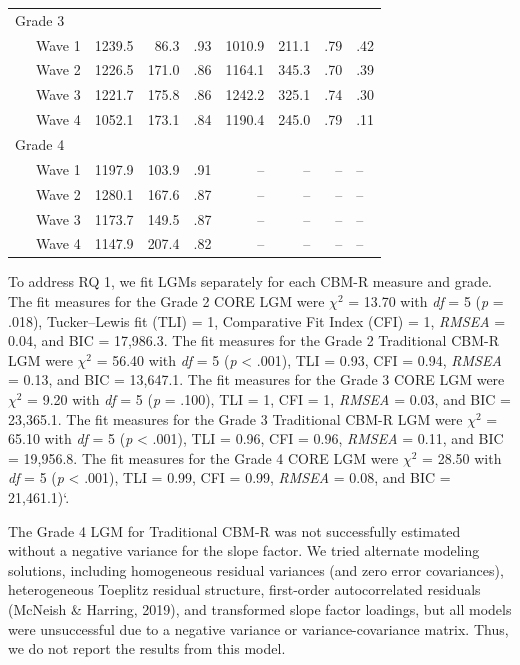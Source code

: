 \documentclass[
  english,
  man, fleqn, noextraspace]{apa6}
\begin{document}
\begin{center}
\begin{ThreePartTable}
\begin{longtable}{lrrrrrrl}
Grade 3 &  &  &  &  &  &  & \\
\ \ \ Wave 1 & 1239.5 & 86.3 & .93 & 1010.9 & 211.1 & .79 & .42\\
\ \ \ Wave 2 & 1226.5 & 171.0 & .86 & 1164.1 & 345.3 & .70 & .39\\
\ \ \ Wave 3 & 1221.7 & 175.8 & .86 & 1242.2 & 325.1 & .74 & .30\\
\ \ \ Wave 4 & 1052.1 & 173.1 & .84 & 1190.4 & 245.0 & .79 & .11\\
Grade 4 &  &  &  &  &  &  & \\
\ \ \ Wave 1 & 1197.9 & 103.9 & .91 & -- & -- & -- & --\\
\ \ \ Wave 2 & 1280.1 & 167.6 & .87 & -- & -- & -- & --\\
\ \ \ Wave 3 & 1173.7 & 149.5 & .87 & -- & -- & -- & --\\
\ \ \ Wave 4 & 1147.9 & 207.4 & .82 & -- & -- & -- & --\\
\bottomrule
\end{longtable}

\end{ThreePartTable}
\end{center}

To address RQ 1, we fit LGMs separately for each CBM-R measure and grade. The fit measures for the Grade 2 CORE LGM were \(\chi^2\) = 13.70 with \emph{df} = 5 (\emph{p} = .018), Tucker--Lewis fit (TLI) = 1, Comparative Fit Index (CFI) = 1, \emph{RMSEA} = 0.04, and BIC = 17,986.3. The fit measures for the Grade 2 Traditional CBM-R LGM were \(\chi^2\) = 56.40 with \emph{df} = 5 (\emph{p} \textless{} .001), TLI = 0.93, CFI = 0.94, \emph{RMSEA} = 0.13, and BIC = 13,647.1. The fit measures for the Grade 3 CORE LGM were \(\chi^2\) = 9.20 with \emph{df} = 5 (\emph{p} = .100), TLI = 1, CFI = 1, \emph{RMSEA} = 0.03, and BIC = 23,365.1. The fit measures for the Grade 3 Traditional CBM-R LGM were \(\chi^2\) = 65.10 with \emph{df} = 5 (\emph{p} \textless{} .001), TLI = 0.96, CFI = 0.96, \emph{RMSEA} = 0.11, and BIC = 19,956.8. The fit measures for the Grade 4 CORE LGM were \(\chi^2\) = 28.50 with \emph{df} = 5 (\emph{p} \textless{} .001), TLI = 0.99, CFI = 0.99, \emph{RMSEA} = 0.08, and BIC = 21,461.1)`.

The Grade 4 LGM for Traditional CBM-R was not successfully estimated without a negative variance for the slope factor. We tried alternate modeling solutions, including homogeneous residual variances (and zero error covariances), heterogeneous Toeplitz residual structure, first-order autocorrelated residuals (McNeish \& Harring, 2019), and transformed slope factor loadings, but all models were unsuccessful due to a negative variance or variance-covariance matrix. Thus, we do not report the results from this model.
\end{document}
